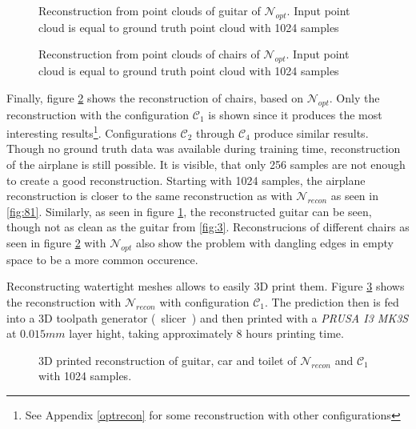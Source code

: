 \begin{figure}[htbp]
  \centering
  \caption{Reconstruction from point clouds of guitar of $\mathcal{N}_{opt}$. Input point cloud is equal to ground truth point cloud with 1024 samples} \label{fig:11}
\end{figure}
\begin{figure}[htbp]
  \centering
  \caption{Reconstruction from point clouds of chairs of $\mathcal{N}_{opt}$. Input point cloud is equal to ground truth point cloud with 1024 samples} \label{fig:10}
\end{figure}

  Finally, figure \ref{fig:10} shows the reconstruction of chairs, based on $\mathcal{N}_{opt}$. Only the reconstruction with the configuration $\mathcal{C}_1$ is shown
  since it produces the most interesting results\footnote{See Appendix \ref{optrecon} for some reconstruction with other configurations}. Configurations $\mathcal{C}_2$ through $\mathcal{C}_4$ produce similar results. Though no ground truth data was available during training time, reconstruction
  of the airplane is still possible. It is visible, that only 256 samples are not enough to create a good reconstruction. Starting with 1024 samples, the airplane reconstruction
  is closer to the same reconstruction as with $\mathcal{N}_{recon}$ as seen in \ref{fig:81}. Similarly, as seen in figure \ref{fig:11}, the reconstructed guitar can be 
  seen, though not as clean as the guitar from \ref{fig:3}. Reconstrucions of different chairs as seen in figure \ref{fig:10} with $\mathcal{N}_{opt}$ also show the problem with dangling edges in empty space
  to be a more common occurence. 


  Reconstructing watertight meshes allows to easily 3D print them. Figure \ref{fig:13} shows the reconstruction with $\mathcal{N}_{recon}$ with configuration $\mathcal{C}_1$. 
  The prediction then is fed into a 3D toolpath generator (~slicer~)\cite{Ranellucci2011} and then printed with a \emph{PRUSA I3 MK3S} at $0.015mm$ layer hight, taking approximately 8 hours printing time.
  \begin{figure}[htbp]
    \centering
    \caption{3D printed reconstruction of guitar, car and toilet of $\mathcal{N}_{recon}$ and $\mathcal{C}_1$ with 1024 samples.} \label{fig:13}
  \end{figure}